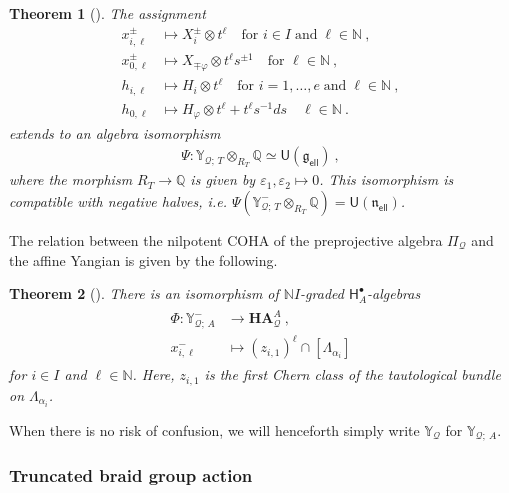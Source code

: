 \documentclass[reqno,a4paper]{amsart}
\newcommand{\N}{\mathbb{N}}
\newcommand{\Q}{\mathbb{Q}}
\newcommand{\Y}{\mathbb{Y}}
\newcommand{\sfU}{\mathsf{U}}
\newcommand{\qv}{\mathcal{Q}}
\newcommand{\frakgell}{\mathfrak{g}_{\mathsf{ell}}}
\newcommand{\fraknell}{\mathfrak{n}_{\mathsf{ell}}}
\newcommand{\Hbullet}{\mathsf{H}^\bullet}
\newcommand{\coha}{\mathbf{HA}}
\newcommand{\cohaqv}{\coha_\qv}
\theoremstyle{basic-theorem}
\newtheorem{theorem}{Theorem}[section]
\numberwithin{equation}{section}
\begin{document}
\begin{theorem}[{\cite[Propositions~\ref*{COHA-Yangian-prop:classical-limit} and \ref*{COHA-Yangian-prop:iso-s-uce-1}]{DPSSV-3}}]
	The assignment
	\begin{align}
		x_{i, \ell}^\pm &\longmapsto X_i^\pm \otimes t^\ell \quad \text{for } i \in I\;\text{and}\; \ell\in \N\ , \\
		x_{0, \ell}^\pm &\longmapsto X_{\mp\varphi}\otimes t^\ell s^{\pm 1}\quad \text{for } \ell\in \N\ , \\
		h_{i, \ell} &\longmapsto H_i\otimes t^\ell \quad \text{for } i=1, \ldots, e\;\text{and}\; \ell\in \N\ , \\
		h_{0, \ell} &\longmapsto H_\varphi\otimes t^\ell+t^\ell s^{-1} ds \quad \ell\in \N\ .
	\end{align}
	extends to an algebra isomorphism 
	\begin{align}
		\Psi\colon \Y_{\qv;\,T}\otimes_{R_T} \Q \simeq \sfU(\frakgell) \ ,
	\end{align} 
	where the morphism $R_T \to \Q$ is given by $\varepsilon_1, \varepsilon_2 \mapsto 0$. This isomorphism is compatible with negative halves, i.e. $\Psi(\Y_{\qv;\,T}^-\otimes_{R_T} \Q)= \sfU(\fraknell)$.
\end{theorem}

The relation between the nilpotent COHA of the preprojective algebra $\Pi_\qv$ and the affine Yangian is given by the following.
\begin{theorem}[{\cite[Theorem~\ref*{COHA-Yangian-thm:PBW}]{DPSSV-3}}]\label{thm:coha=yangian}
	There is an isomorphism of $\N I$-graded $\Hbullet_A$-algebras 
	\begin{align}\label{eq:Phi}
		\begin{split}
			\Phi\colon\Y_{\qv;\, A}^-&\longrightarrow \cohaqv^{A}\ ,\\
			x^-_{i,\ell} &\longmapsto (z_{i,1})^\ell\cap[\Lambda_{\alpha_i}]
		\end{split}
	\end{align}
	for $i\in I$ and $\ell\in \N$. Here, $z_{i,1}$ is the first Chern class of the tautological bundle on $\Lambda_{\alpha_i}$.
\end{theorem}
When there is no risk of confusion, we will henceforth simply write $\Y_\qv$ for $\Y_{\qv;\ A}$.

\subsubsection{Truncated braid group action}
\end{document}
